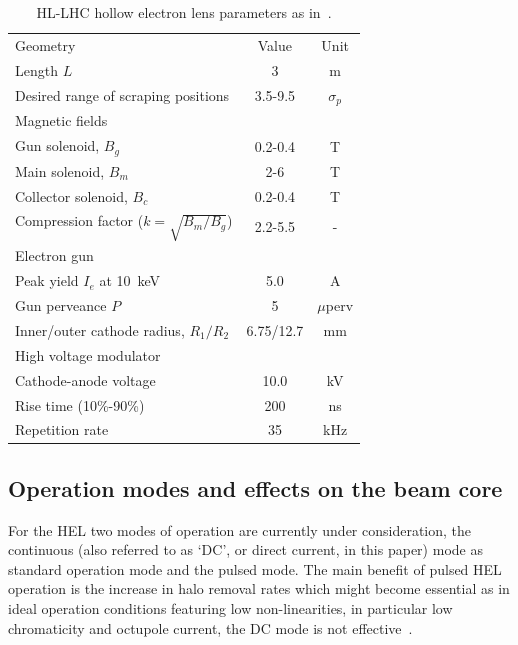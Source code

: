 \documentclass[%
 reprint,
 amsmath,amssymb,
 aps,
prstab,
]{revtex4-1}
\begin{document}
\begin{table}[t]
	\caption{\label{tab:hel_param}%
		HL-LHC hollow electron lens parameters as in~\cite{hel_cdr}.
	}
	\begin{ruledtabular}
		\begin{tabular}{lcc}
			Geometry & Value& Unit\\
			\colrule
			Length $L$    &  3 & m\\
			Desired range of scraping positions & 3.5-9.5 &$\sigma_p$\\
			\colrule
			Magnetic fields & & \\
			\colrule
			Gun solenoid, $B_g$ & 0.2-0.4 & T\\
			Main solenoid, $B_m$ & 2-6 & T\\
			Collector solenoid, $B_c$ & 0.2-0.4 & T\\
			Compression factor ($k=\sqrt{B_m/B_g}$) & 2.2-5.5 & -\\
			\colrule
			Electron gun & & \\
			\colrule
			Peak yield $I_e$ at 10~keV & 5.0 & A\\
			Gun perveance $P$ & 5 & $\mu$perv\\
			Inner/outer cathode radius, $R_1/R_2$ & 6.75/12.7 & mm\\
			\colrule
			High voltage modulator & & \\
			\colrule
			Cathode-anode voltage & 10.0 & kV\\
			Rise time (10\%-90\%) & 200 & ns \\
			Repetition rate & 35 & kHz
		\end{tabular}
	\end{ruledtabular}
\end{table}

\subsection{Operation modes and effects on the beam core}
\label{sec:hel:core}

For the HEL two modes of operation are currently under consideration,
the continuous (also referred to as `DC', or direct current, in this
paper) mode as standard operation mode and the pulsed mode. The main
benefit of pulsed HEL operation is the increase in halo removal rates
which might become essential as in ideal operation conditions
featuring low non-linearities, in particular low chromaticity and
octupole current, the DC mode is not
effective~\cite{hel_halo_hllhc_fitterer,hl_halo_ipac2017}.
\end{document}
